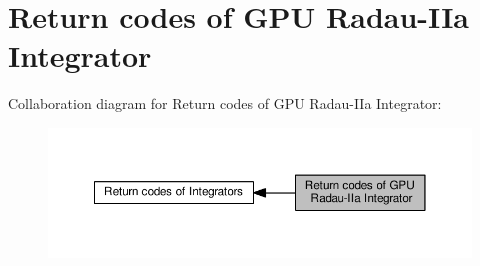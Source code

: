 \hypertarget{group__RKCU__ErrCodes}{}\section{Return codes of G\+PU Radau-\/\+I\+Ia Integrator}
\label{group__RKCU__ErrCodes}
Collaboration diagram for Return codes of G\+PU Radau-\/\+I\+Ia Integrator\+:
\nopagebreak
\begin{figure}[H]
\begin{center}
\leavevmode
\includegraphics[width=350pt]{group__RKCU__ErrCodes}
\end{center}
\end{figure}
